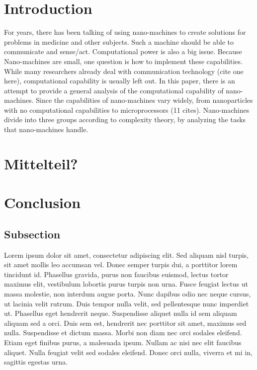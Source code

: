 \documentclass[10pt,sigconf]{acmart}
\begin{document}
\section{Introduction}
For years, there has been talking of using nano-machines to create solutions for problems in medicine and other subjects. Such a machine should be able to communicate and sense/act. Computational power is also a big issue.
Because Nano-machines are small, one question is how to implement these capabilities. 
While many researchers already deal with communication technology (cite one here), computational capability is usually left out.
In this paper, there is an attempt to provide a general analysis of the computational capability of nano-machines.
Since the capabilities of nano-machines vary widely, from nanoparticles with no computational capabilities to microprocessors (11 cites). Nano-machines divide into three groups according to complexity theory,
by analyzing the tasks that nano-machines handle.



\section{Mittelteil?}

\section{Conclusion}

\subsection{Subsection}

Lorem ipsum dolor sit amet, consectetur adipiscing elit.
Sed aliquam nisl turpis, sit amet mollis leo accumsan vel.
Donec semper turpis dui, a porttitor lorem tincidunt id.
Phasellus gravida, purus non faucibus euismod, lectus tortor maximus elit, vestibulum lobortis purus turpis non urna.
Fusce feugiat lectus ut massa molestie, non interdum augue porta.
Nunc dapibus odio nec neque cursus, ut lacinia velit rutrum.
Duis tempor nulla velit, sed pellentesque nunc imperdiet ut.
Phasellus eget hendrerit neque.
Suspendisse aliquet nulla id sem aliquam aliquam sed a orci.
Duis sem est, hendrerit nec porttitor sit amet, maximus sed nulla.
Suspendisse et dictum massa.
Morbi non diam nec orci sodales eleifend.
Etiam eget finibus purus, a malesuada ipsum.
Nullam ac nisi nec elit faucibus aliquet.
Nulla feugiat velit sed sodales eleifend.
Donec orci nulla, viverra et mi in, sagittis egestas urna.
\end{document}
